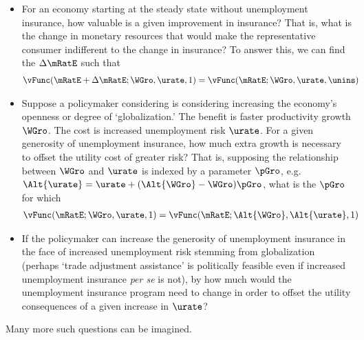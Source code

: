 \documentclass{\handout}
\begin{document}
\begin{CDCPrivate}
\begin{itemize}
\item For an economy starting at the steady state without unemployment insurance, how valuable
is a given improvement in insurance?  That is, what is the change in monetary resources that would
make the representative consumer indifferent to the change in insurance?  To answer this, we can find the
$\Delta \mRatE$ such that 
\begin{equation}\begin{gathered}\begin{aligned}
  \vFunc(\mRatE+\Delta \mRatE;\WGro,\urate,1) & =    \vFunc(\mRatE;\WGro,\urate,\unins)
\end{aligned}\end{gathered}\end{equation}
\item Suppose a policymaker considering is considering increasing the economy's openness or degree of `globalization.'  The benefit
is faster productivity growth $\WGro$.  The cost is increased unemployment risk $\urate$.  For a given
generosity of unemployment insurance, how much extra growth is necessary to offset the utility cost
of greater risk?  That is, supposing the relationship between $\WGro$ and $\urate$ is indexed by a parameter $\pGro$, e.g. $\Alt{\urate} = \urate + (\Alt{\WGro}-\WGro)\pGro $, what is the $\pGro$ for which
\begin{equation}\begin{gathered}\begin{aligned}
  \vFunc(\mRatE;\WGro,\urate,1) & =  \vFunc(\mRatE;\Alt{\WGro},\Alt{\urate},1)
\end{aligned}\end{gathered}\end{equation}
\item If the policymaker can increase the generosity of unemployment insurance in the face of 
increased unemployment risk stemming from globalization (perhaps
`trade adjustment assistance' is politically feasible even if
increased unemployment insurance {\it per se} is not), by how much would the unemployment
insurance program need to change in order to offset the utility consequences of a given increase 
in $\urate$?  %
\end{itemize}

Many more such questions can be imagined.
\end{CDCPrivate}
\end{document}
